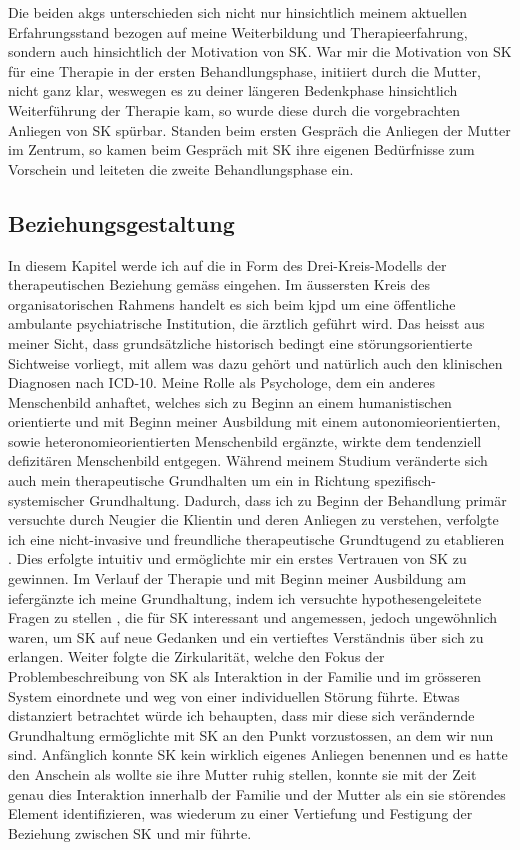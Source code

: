 Die beiden \acp{akg} unterschieden sich nicht nur hinsichtlich meinem aktuellen Erfahrungsstand bezogen auf meine Weiterbildung und Therapieerfahrung, sondern auch hinsichtlich der Motivation von SK. War mir die Motivation von SK für eine Therapie in der ersten Behandlungsphase, initiiert durch die Mutter, nicht ganz klar, weswegen es zu deiner längeren Bedenkphase hinsichtlich Weiterführung der Therapie kam, so wurde diese durch die vorgebrachten Anliegen von SK spürbar. Standen beim ersten Gespräch die Anliegen der Mutter im Zentrum, so kamen beim Gespräch mit SK ihre eigenen Bedürfnisse zum Vorschein und leiteten die zweite Behandlungsphase ein. 


\subsection{Beziehungsgestaltung} \label{lbBeziehungsgestaltung}  
In diesem Kapitel werde ich auf die  in Form des Drei-Kreis-Modells der therapeutischen Beziehung gemäss  eingehen. Im äussersten Kreis des organisatorischen Rahmens handelt es sich beim \ac{kjpd} um eine öffentliche ambulante psychiatrische Institution, die ärztlich geführt wird. Das heisst aus meiner Sicht, dass grundsätzliche historisch bedingt eine störungsorientierte Sichtweise vorliegt, mit allem was dazu gehört und natürlich auch den klinischen Diagnosen nach ICD-10. Meine Rolle als Psychologe, dem ein anderes Menschenbild anhaftet, welches sich zu Beginn an einem humanistischen orientierte und mit Beginn meiner Ausbildung mit einem autonomieorientierten, sowie heteronomieorientierten Menschenbild ergänzte, wirkte dem tendenziell defizitären Menschenbild entgegen. Während meinem Studium veränderte sich auch mein therapeutische Grundhalten um ein in Richtung spezifisch-systemischer Grundhaltung. Dadurch, dass ich zu Beginn der Behandlung primär versuchte durch Neugier die Klientin und deren Anliegen zu verstehen, verfolgte ich eine nicht-invasive und freundliche therapeutische Grundtugend zu etablieren \cite{Cecchin1988}. Dies erfolgte intuitiv und ermöglichte mir ein erstes Vertrauen von SK zu gewinnen. Im Verlauf der Therapie und mit Beginn meiner Ausbildung am \ac{ief}ergänzte ich meine Grundhaltung, indem ich versuchte hypothesengeleitete Fragen zu stellen \cite{Andersen1990}, die für SK interessant und angemessen, jedoch ungewöhnlich waren, um SK auf neue Gedanken und ein vertieftes Verständnis über sich zu erlangen. Weiter folgte die Zirkularität, welche den Fokus der Problembeschreibung von SK als Interaktion in der Familie und im grösseren System einordnete und weg von einer individuellen Störung führte. Etwas distanziert betrachtet würde ich behaupten, dass mir diese sich verändernde Grundhaltung ermöglichte mit SK an den Punkt vorzustossen, an dem wir nun sind. Anfänglich konnte SK kein wirklich eigenes Anliegen benennen und es hatte den Anschein als wollte sie ihre Mutter ruhig stellen, konnte sie mit der Zeit genau dies Interaktion innerhalb der Familie und der Mutter als ein sie störendes Element identifizieren, was wiederum zu einer Vertiefung und Festigung der Beziehung zwischen SK und mir führte.

